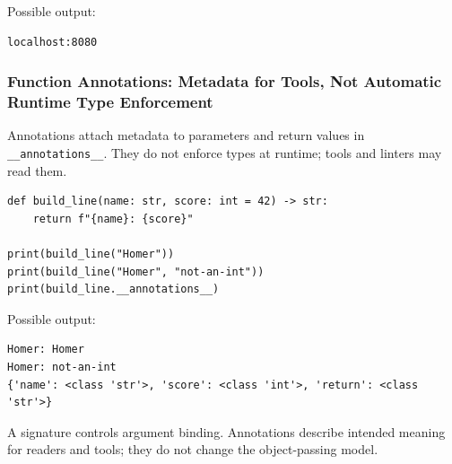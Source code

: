 Possible output:

\begin{verbatim}
localhost:8080
\end{verbatim}

\subsubsection{Function Annotations: Metadata for Tools, Not Automatic Runtime Type Enforcement}

Annotations attach metadata to parameters and return values in \texttt{\_\_annotations\_\_}. They do not enforce types at runtime; tools and linters may read them.

\begin{verbatim}
def build_line(name: str, score: int = 42) -> str:
    return f"{name}: {score}"

print(build_line("Homer"))
print(build_line("Homer", "not-an-int"))
print(build_line.__annotations__)
\end{verbatim}

Possible output:

\begin{verbatim}
Homer: Homer
Homer: not-an-int
{'name': <class 'str'>, 'score': <class 'int'>, 'return': <class 'str'>}
\end{verbatim}

A signature controls argument binding. Annotations describe intended meaning for readers and tools; they do not change the object-passing model.
